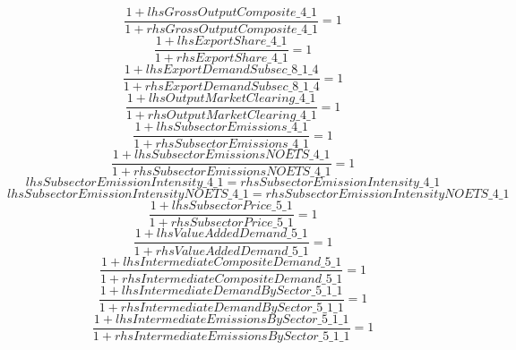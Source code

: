 \begin{dmath}
\frac{1+{lhsGrossOutputComposite\_4\_1}}{1+{rhsGrossOutputComposite\_4\_1}}=1
\end{dmath}
\begin{dmath}
\frac{1+{lhsExportShare\_4\_1}}{1+{rhsExportShare\_4\_1}}=1
\end{dmath}
\begin{dmath}
\frac{1+{lhsExportDemandSubsec\_8\_1\_4}}{1+{rhsExportDemandSubsec\_8\_1\_4}}=1
\end{dmath}
\begin{dmath}
\frac{1+{lhsOutputMarketClearing\_4\_1}}{1+{rhsOutputMarketClearing\_4\_1}}=1
\end{dmath}
\begin{dmath}
\frac{1+{lhsSubsectorEmissions\_4\_1}}{1+{rhsSubsectorEmissions\_4\_1}}=1
\end{dmath}
\begin{dmath}
\frac{1+{lhsSubsectorEmissionsNOETS\_4\_1}}{1+{rhsSubsectorEmissionsNOETS\_4\_1}}=1
\end{dmath}
\begin{dmath}
{lhsSubsectorEmissionIntensity\_4\_1}={rhsSubsectorEmissionIntensity\_4\_1}
\end{dmath}
\begin{dmath}
{lhsSubsectorEmissionIntensityNOETS\_4\_1}={rhsSubsectorEmissionIntensityNOETS\_4\_1}
\end{dmath}
\begin{dmath}
\frac{1+{lhsSubsectorPrice\_5\_1}}{1+{rhsSubsectorPrice\_5\_1}}=1
\end{dmath}
\begin{dmath}
\frac{1+{lhsValueAddedDemand\_5\_1}}{1+{rhsValueAddedDemand\_5\_1}}=1
\end{dmath}
\begin{dmath}
\frac{1+{lhsIntermediateCompositeDemand\_5\_1}}{1+{rhsIntermediateCompositeDemand\_5\_1}}=1
\end{dmath}
\begin{dmath}
\frac{1+{lhsIntermediateDemandBySector\_5\_1\_1}}{1+{rhsIntermediateDemandBySector\_5\_1\_1}}=1
\end{dmath}
\begin{dmath}
\frac{1+{lhsIntermediateEmissionsBySector\_5\_1\_1}}{1+{rhsIntermediateEmissionsBySector\_5\_1\_1}}=1
\end{dmath}
